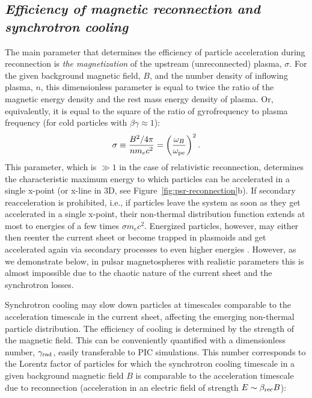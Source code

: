 \subsection*{\small\it Efficiency of magnetic reconnection and synchrotron cooling}

The main parameter that determines the efficiency of particle acceleration during reconnection is \emph{the magnetization} of the upstream (unreconnected) plasma, $\sigma$. For the given background magnetic field, $B$, and the number density of inflowing plasma, $n$, this dimensionless parameter is equal to twice the ratio of the magnetic energy density and the rest mass energy density of plasma. Or, equivalently, it is equal to the square of the ratio of gyrofrequency to plasma frequency (for cold particles with $\beta\gamma\approx 1$):
\begin{equation}
    \sigma \equiv \frac{B^2/4\pi}{n m_e c^2} = \left(\frac{\omega_{B}}{\omega_{{\rm p}e}}\right)^2.
\end{equation}
\noindent This parameter, which is $\gg 1$ in the case of relativistic reconnection, determines the characteristic maximum energy to which particles can be accelerated in a single x-point (or x-line in 3D, see Figure~\ref{fig:psr-reconnection}b). If secondary reacceleration is prohibited, i.e., if particles leave the system as soon as they get accelerated in a single x-point, their non-thermal distribution function extends at most to energies of a few times $\sigma m_e c^2$. Energized particles, however, may either then reenter the current sheet or become trapped in plasmoids and get accelerated again via secondary processes to even higher energies \citep{2018MNRAS.481.5687P,2021ApJ...912...48H}. However, as we demonstrate below, in pulsar magnetospheres with realistic parameters this is almost impossible due to the chaotic nature of the current sheet and the synchrotron losses. 

Synchrotron cooling may slow down particles at timescales comparable to the acceleration timescale in the current sheet, affecting the emerging non-thermal particle distribution. The efficiency of cooling is determined by the strength of the magnetic field. This can be conveniently quantified with a dimensionless number, $\gamma_{\rm rad}$, easily transferable to PIC simulations. This number corresponds to the Lorentz factor of particles for which the synchrotron cooling timescale in a given background magnetic field $B$ is comparable to the acceleration timescale due to reconnection (acceleration in an electric field of strength $E\sim \beta_{\rm rec}B$):

